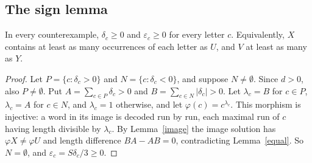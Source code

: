 \subsection{The sign lemma}
\begin{lemma}\label{sign}
In every counterexample, \(\delta_c\ge0\) and \(\varepsilon_c\ge0\) for every letter \(c\). Equivalently, \(X\) contains at least as many occurrences of each letter as \(U\), and \(V\) at least as many as \(Y\).
\end{lemma}
\begin{proof}
Let \(P=\{c:\delta_c>0\}\) and \(N=\{c:\delta_c<0\}\), and suppose \(N\ne\emptyset\). Since \(d>0\), also \(P\ne\emptyset\). Put \(A=\sum_{c\in P}\delta_c>0\) and \(B=\sum_{c\in N}|\delta_c|>0\). Let \(\lambda_c=B\) for \(c\in P\), \(\lambda_c=A\) for \(c\in N\), and \(\lambda_c=1\) otherwise, and let \(\varphi(c)=c^{\lambda_c}\). This morphism is injective: a word in its image is decoded run by run, each maximal run of \(c\) having length divisible by \(\lambda_c\). By Lemma~\ref{image} the image solution has \(\varphi X\ne\varphi U\) and length difference \(BA-AB=0\), contradicting Lemma~\ref{equal}. So \(N=\emptyset\), and \(\varepsilon_c=S\delta_c/3\ge0\).
\end{proof}

